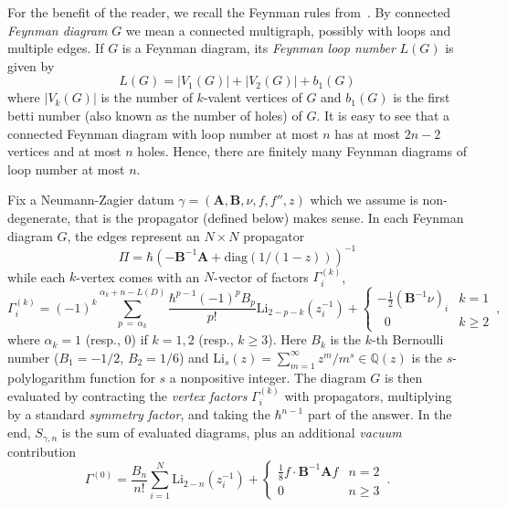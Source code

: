 \documentclass[12pt]{amsart}
\theoremstyle{definition}
\def\BQ{\mathbb Q}
\def\ga{\gamma}
\def\Li{\mathrm{Li}}
\newcommand{\mb}{\mathbf}
\begin{document}
For the benefit of the reader, we recall the Feynman rules 
from~\cite[Sec.1.6-1.8]{DG}. By connected \emph{Feynman diagram} $G$ we mean a 
connected multigraph, possibly with loops and multiple edges.
If $G$ is a Feynman diagram, its \emph{Feynman loop number} $L(G)$ is given by
$$
L(G)=|V_1(G)|+|V_2(G)|+b_1(G) 
$$
where $|V_k(G)|$ is the number of $k$-valent vertices of $G$ and 
$b_1(G)$ is the first betti number (also known as the number of holes) of $G$.
It is easy to see that a connected Feynman diagram with loop number
at most $n$ has at most $2n-2$ vertices and at most $n$ holes.
Hence, there are finitely many Feynman diagrams of loop number at most $n$.

Fix a Neumann-Zagier datum $\ga=(\mb A, \mb B, \nu, f, f'', z)$ which
we assume is non-degenerate, that is the propagator (defined below) makes
sense. 
In each Feynman diagram $G$, the edges represent an $N\times N$ propagator
$$
\Pi=\hbar \left( -\mb B^{-1}\mb A+\mathrm{diag}(1/(1-z)) \right)^{-1}
$$
while each $k$-vertex comes with an $N$-vector of factors $\Gamma^{(k)}_i$,
$$
\Gamma^{(k)}_i = (-1)^k\sum_{p\,
=\,\alpha_k}^{\alpha_k +n-L(D)}\frac{\hbar^{p-1}(-1)^p B_p}{p!}\Li_{2-p-k}(z_i^{-1}) 
+ \begin{cases} -\tfrac12(\mb B^{-1}\nu)_i & k= 1 \\ \;\;0 & k \geq 2 
\end{cases}\,,
$$
%
where $\alpha_k = 1$ (resp., $0$) if $k=1,2$ (resp., $k\geq 3$).
Here $B_k$ is the $k$-th Bernoulli number ($B_1=-1/2$, $B_2=1/6$) and
$\Li_s(z)=\sum_{m=1}^\infty z^m/m^s \in \BQ(z)$ is the $s$-polylogarithm
function for $s$ a nonpositive integer.
The diagram $G$ is then evaluated by contracting the \emph{vertex factors} 
$\Gamma^{(k)}_i$ with 
propagators, multiplying by a standard {\em symmetry factor}, and taking the 
$\hbar^{n-1}$ part of the answer. In the end, $S_{\ga,n}$ is the sum of 
evaluated diagrams, plus an additional {\em vacuum} contribution
$$
\Gamma^{(0)} = \frac{B_n}{n!}\sum_{i=1}^N\Li_{2-n}(z_i^{-1}) 
+ \begin{cases} \tfrac18f\cdot\mb B^{-1}\mb Af & n=2 \\ 0 & n\geq 3 
\end{cases}\,.
$$
\end{document}
